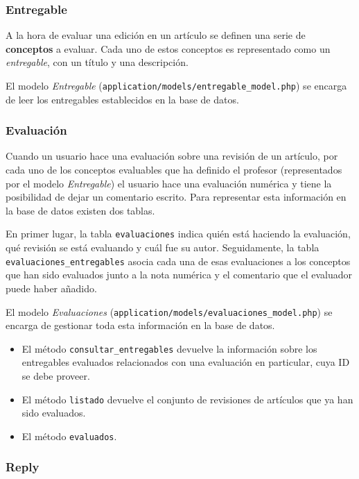 \documentclass[11pt]{article}
\begin{document}
\subsubsection{Entregable}

A la hora de evaluar una edición en un artículo se definen una serie de
\textbf{conceptos} a evaluar. Cada uno de estos conceptos es representado como
un \textit{entregable}, con un título y una descripción.

El modelo \textit{Entregable}
(\texttt{application/models/entregable\_model.php}) se encarga de leer los
entregables establecidos en la base de datos.

\subsubsection{Evaluación}

Cuando un usuario hace una evaluación sobre una revisión de un artículo, por
cada uno de los conceptos evaluables que ha definido el profesor (representados
por el modelo \textit{Entregable}) el usuario hace una evaluación numérica y
tiene la posibilidad de dejar un comentario escrito. Para representar esta
información en la base de datos existen dos tablas. 

En primer lugar, la tabla \texttt{evaluaciones} indica quién está haciendo la
evaluación, qué revisión se está evaluando y cuál fue su autor. Seguidamente, la
tabla \texttt{evaluaciones\_entregables} asocia cada una de esas evaluaciones a
los conceptos que han sido evaluados junto a la nota numérica y el comentario
que el evaluador puede haber añadido.

El modelo \textit{Evaluaciones}
(\texttt{application/models/evaluaciones\_model.php}) se encarga de gestionar
toda esta información en la base de datos. 

\begin{itemize}
\item El método \texttt{consultar\_entregables} devuelve la información sobre
  los entregables evaluados relacionados con una evaluación en particular, cuya
  ID se debe proveer.
\item El método \texttt{listado} devuelve el conjunto de revisiones de artículos
  que ya han sido evaluados.
\item El método \texttt{evaluados}.
\end{itemize}

\subsubsection{Reply}
\end{document}
